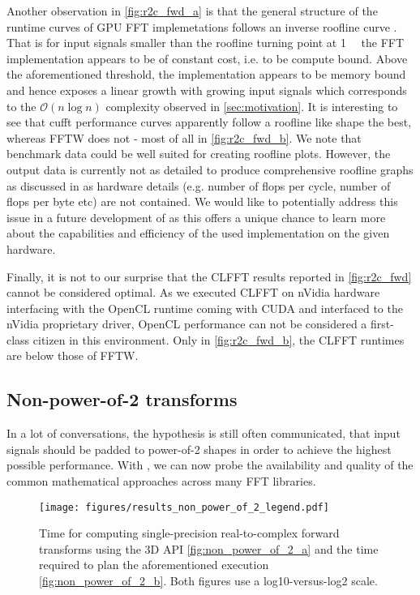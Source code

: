 Another observation in \cref{fig:r2c_fwd_a} is that the general structure of the runtime curves of GPU FFT implemetations follows an inverse roofline curve \cite{williams2009roofline}. That is for input signals smaller than the roofline turning point at \SI{1}{\mebi\byte} the FFT implementation appears to be of constant cost, i.e. to be compute bound. Above the aforementioned threshold, the implementation appears to be memory bound and hence exposes a linear growth with growing input signals which corresponds to the $\mathcal{O}(n \log n)$ complexity observed in \cref{sec:motivation}. It is interesting to see that cufft performance curves apparently follow a roofline like shape the best, whereas FFTW does not - most of all in \cref{fig:r2c_fwd_b}.  We note that \gearshifft{} benchmark data could be well suited for creating roofline plots. However, the output data is currently not as detailed to produce comprehensive roofline graphs as discussed in \cite{ofenbeck2014applying} as hardware details (e.g. number of flops per cycle, number of flops per byte etc) are not contained. We would like to potentially address this issue in a future development of \gearshifft{} as this offers a unique chance to learn more about the capabilities and efficiency of the used implementation on the given hardware. 
 
Finally, it is not to our surprise that the CLFFT results reported in \cref{fig:r2c_fwd} cannot be considered optimal. As we executed CLFFT on nVidia hardware interfacing with the OpenCL runtime coming with CUDA and interfaced to the nVidia proprietary driver, OpenCL performance can not be considered a first-class citizen in this environment. Only in \cref{fig:r2c_fwd_b}, the CLFFT runtimes are below those of FFTW.
 
\subsection{Non-power-of-2 transforms}
\label{ssec:nonpowerof2}

In a lot of conversations, the hypothesis is still often communicated, that input signals should be padded to power-of-2 shapes in order to achieve the highest possible performance. With \gearshifft{}, we can now probe the availability and quality of the common mathematical approaches across many FFT libraries. 

\begin{figure}[!tbp]
  \centering
  \texttt{[image: figures/results\_non\_power\_of\_2\_legend.pdf]}\vspace{-1em}
  \hfill
  \caption{Time for computing single-precision real-to-complex forward transforms using the 3D API \cref{fig:non_power_of_2_a} and the time required to plan the aforementioned execution \cref{fig:non_power_of_2_b}. Both figures use a log10-versus-log2 scale.}
  \label{fig:non_power_of_2}
\end{figure}

